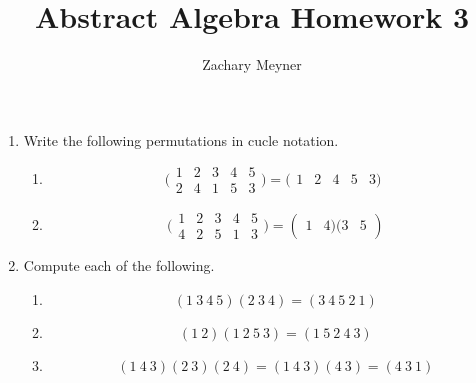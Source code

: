 \documentclass[12pt]{article}
\title{\large Abstract Algebra Homework 3}
\author{\large Zachary Meyner}
\date{}
\newcommand\setitemnumber[1]{\setcounter{enumi}{\numexpr#1-1\relax}}
\begin{document}
\maketitle
\begin{enumerate}[label=\textbf{\arabic*}.]
	\setitemnumber{1}
	\item Write the following permutations in cucle notation.
	      \begin{enumerate}
		      \item \begin{equation*}
			            \bigg(\begin{matrix}
				            1 & 2 & 3 & 4 & 5 \\
				            2 & 4 & 1 & 5 & 3
			            \end{matrix}\bigg) = (\begin{matrix}
				            1 & 2 & 4 & 5 & 3)
			            \end{matrix}
		            \end{equation*}
		      \item \begin{equation*}
			            \bigg(\begin{matrix}
				            1 & 2 & 3 & 4 & 5 \\
				            4 & 2 & 5 & 1 & 3
			            \end{matrix}\bigg) = (\begin{matrix}
				            1 & 4)(3 & 5
			            \end{matrix})
		            \end{equation*}
	      \end{enumerate}
	      \setitemnumber{2}
	\item Compute each of the following.
	      \begin{enumerate}
		      \item \begin{equation*}
			            (1 \ 3 \ 4 \ 5)(2 \ 3 \ 4) = (3 \ 4 \ 5 \ 2 \ 1)
		            \end{equation*}
		      \item \begin{equation*}
			            (1 \ 2)(1 \ 2 \ 5 \ 3) = (1 \ 5 \ 2 \ 4 \ 3)
		            \end{equation*}
		      \item \begin{equation*}
			            (1 \ 4 \ 3)(2 \ 3)(2 \ 4) = (1 \ 4 \ 3)(4 \ 3) = (4 \ 3 \ 1)
		            \end{equation*}

\end{enumerate}
\end{enumerate}
\end{document}
